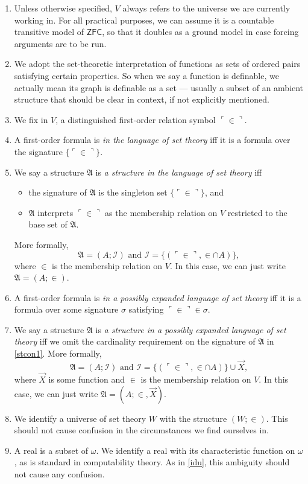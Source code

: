 \documentclass[12pt]{article}
\numberwithin{equation}{section}
\begin{document}
\begin{con}
\leavevmode
\begin{enumerate}[label=(\arabic*)]
    \item Unless otherwise specified, $V$ always refers to the universe we are currently working in. For all practical purposes, we can assume it is a countable transitive model of $\mathsf{ZFC}$, so that it doubles as a ground model in case forcing arguments are to be run.
    \item We adopt the set-theoretic interpretation of functions as sets of ordered pairs satisfying certain properties. So when we say a function is definable, we actually mean its graph is definable as a set --- usually a subset of an ambient structure that should be clear in context, if not explicitly mentioned.
    \item We fix in $V$, a distinguished first-order relation symbol $\ulcorner \in \urcorner$.
    \item A first-order formula is \emph{in the language of set theory} iff it is a formula over the signature $\{\ulcorner \in \urcorner\}$.
    \item\label{stcon1} We say a structure $\mathfrak{A}$ is \emph{a structure in the language of set theory} iff 
    \begin{itemize}
        \item the signature of $\mathfrak{A}$ is the singleton set $\{\ulcorner \in \urcorner\}$, and
        \item $\mathfrak{A}$ interprets $\ulcorner \in \urcorner$ as the membership relation on $V$ restricted to the base set of $\mathfrak{A}$.
    \end{itemize}
    More formally, $$\mathfrak{A} = (A; \mathcal{I}) \text{ and } \mathcal{I} = \{(\ulcorner \in \urcorner, \in \cap A)\},$$ where $\in$ is the membership relation on $V$. In this case, we can just write $\mathfrak{A} = (A; \in)$.
    \item A first-order formula is \emph{in a possibly expanded language of set theory} iff it is a formula over some signature $\sigma$ satisfying $\ulcorner \in \urcorner \in \sigma$.
    \item We say a structure $\mathfrak{A}$ is \emph{a structure in a possibly expanded language of set theory} iff we omit the cardinality requirement on the signature of $\mathfrak{A}$ in \ref{stcon1}. More formally, $$\mathfrak{A} = (A; \mathcal{I}) \text{ and } \mathcal{I} = \{(\ulcorner \in \urcorner, \in \cap A)\} \cup \Vec{X},$$ where $\Vec{X}$ is some function and $\in$ is the membership relation on $V$. In this case, we can just write $\mathfrak{A} = (A; \in, \Vec{X})$.
    \item\label{idu} We identify a universe of set theory $W$ with the structure $(W; \in)$. This should not cause confusion in the circumstances we find ourselves in.
    \item A real is a subset of $\omega$. We identify a real with its characteristic function on $\omega$, as is standard in computability theory. As in \ref{idu}, this ambiguity should not cause any confusion.
\end{enumerate}
\end{con}
\end{document}
